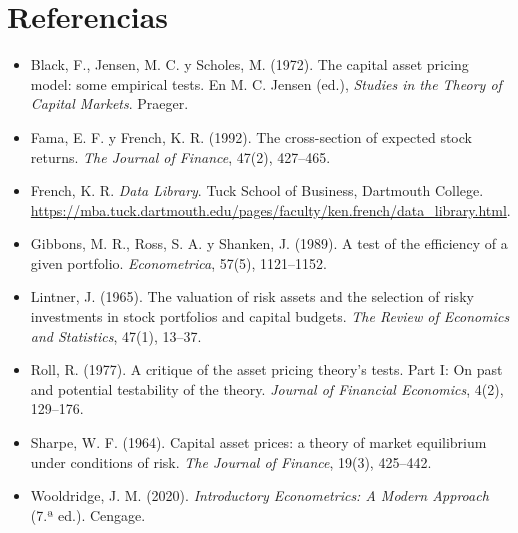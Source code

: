 \section*{Referencias}
\begin{itemize}[leftmargin=*]
  \item Black, F., Jensen, M. C. y Scholes, M. (1972). The capital asset pricing model: some empirical
        tests. En M. C. Jensen (ed.), \emph{Studies in the Theory of Capital Markets}. Praeger.
  \item Fama, E. F. y French, K. R. (1992). The cross-section of expected stock returns. \emph{The Journal
        of Finance}, 47(2), 427--465.
  \item French, K. R. \emph{Data Library}. Tuck School of Business, Dartmouth College.
        \url{https://mba.tuck.dartmouth.edu/pages/faculty/ken.french/data_library.html}.
  \item Gibbons, M. R., Ross, S. A. y Shanken, J. (1989). A test of the efficiency of a given portfolio.
        \emph{Econometrica}, 57(5), 1121--1152.
  \item Lintner, J. (1965). The valuation of risk assets and the selection of risky investments in stock
        portfolios and capital budgets. \emph{The Review of Economics and Statistics}, 47(1), 13--37.
  \item Roll, R. (1977). A critique of the asset pricing theory's tests. Part I: On past and potential
        testability of the theory. \emph{Journal of Financial Economics}, 4(2), 129--176.
  \item Sharpe, W. F. (1964). Capital asset prices: a theory of market equilibrium under conditions of
        risk. \emph{The Journal of Finance}, 19(3), 425--442.
  \item Wooldridge, J. M. (2020). \emph{Introductory Econometrics: A Modern Approach} (7.ª ed.). Cengage.
\end{itemize}
